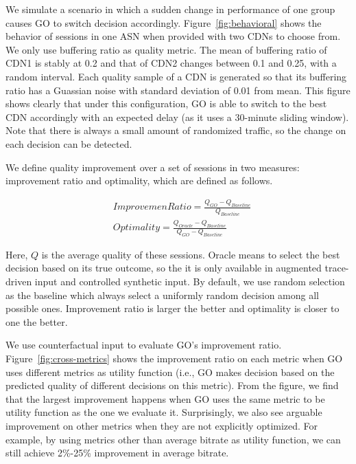  We simulate a scenario in which a sudden change in performance of one group causes GO to switch decision accordingly. Figure~\ref{fig:behavioral} shows the behavior of sessions in one ASN when provided with two CDNs to choose from. We only use buffering ratio as quality metric. The mean of buffering ratio of CDN1 is stably at 0.2 and that of CDN2 changes between 0.1 and 0.25, with a random interval. Each quality sample of a CDN is generated so that its buffering ratio has a Guassian noise with standard deviation of 0.01 from mean. This figure shows clearly that under this configuration, GO is able to switch to the best CDN accordingly with an expected delay (as it uses a 30-minute sliding window). Note that there is always a small amount of randomized traffic, so the change on each decision can be detected. %




\label{subsec:go-improve}

We define quality improvement over a set of sessions in two measures: improvement ratio and optimality, which are defined as follows.

\begin{align*}
& ImprovemenRatio=\frac{Q_{GO}-Q_{Baseline}}{Q_{Baseline}}\\
& Optimality=\frac{Q_{Oracle}-Q_{Baseline}}{Q_{GO}-Q_{Baseline}}
\end{align*}

Here, $Q$ is the average quality of these sessions. Oracle means to select the best decision based on its true outcome, so the it is only available in augmented trace-driven input and controlled synthetic input.  By default, we use random selection as the baseline which always select a uniformly random decision among all possible ones. Improvement ratio is larger the better and optimality is closer to one the better.


We use counterfactual input to evaluate GO's improvement ratio. Figure~\ref{fig:cross-metrics} shows the improvement ratio on each metric when GO uses different metrics as utility function (i.e., GO makes decision based on the predicted quality of different decisions on this metric). From the figure, we find that the largest improvement happens when GO uses the same metric to be utility function as the one we evaluate it. Surprisingly, we also see arguable improvement on other metrics when they are not explicitly optimized. For example, by using metrics other than average bitrate as utility function, we can still achieve 2\%-25\% improvement in average bitrate.


